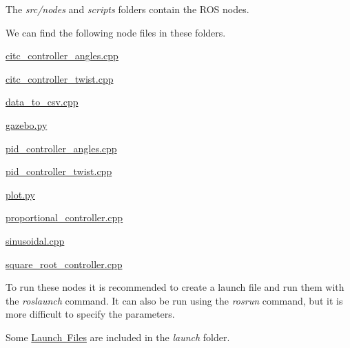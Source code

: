 The {\itshape src/nodes} and {\itshape scripts} folders contain the ROS nodes.

We can find the following node files in these folders.


\begin{DoxyItemize}
\item \mbox{\hyperlink{citc__controller__angles_8cpp}{citc\+\_\+controller\+\_\+angles.\+cpp}}
\item \mbox{\hyperlink{citc__controller__twist_8cpp}{citc\+\_\+controller\+\_\+twist.\+cpp}}
\item \mbox{\hyperlink{data__to__csv_8cpp}{data\+\_\+to\+\_\+csv.\+cpp}}
\item \mbox{\hyperlink{gazebo_8py}{gazebo.\+py}}
\item \mbox{\hyperlink{pid__controller__angles_8cpp}{pid\+\_\+controller\+\_\+angles.\+cpp}}
\item \mbox{\hyperlink{pid__controller__twist_8cpp}{pid\+\_\+controller\+\_\+twist.\+cpp}}
\item \mbox{\hyperlink{plot_8py}{plot.\+py}}
\item \mbox{\hyperlink{proportional__controller_8cpp}{proportional\+\_\+controller.\+cpp}}
\item \mbox{\hyperlink{sinusoidal_8cpp}{sinusoidal.\+cpp}}
\item \mbox{\hyperlink{square__root__controller_8cpp}{square\+\_\+root\+\_\+controller.\+cpp}}
\end{DoxyItemize}

To run these nodes it is recommended to create a launch file and run them with the {\itshape roslaunch} command. It can also be run using the {\itshape rosrun} command, but it is more difficult to specify the parameters.

Some \mbox{\hyperlink{launch_files}{Launch Files}} are included in the {\itshape launch} folder. 